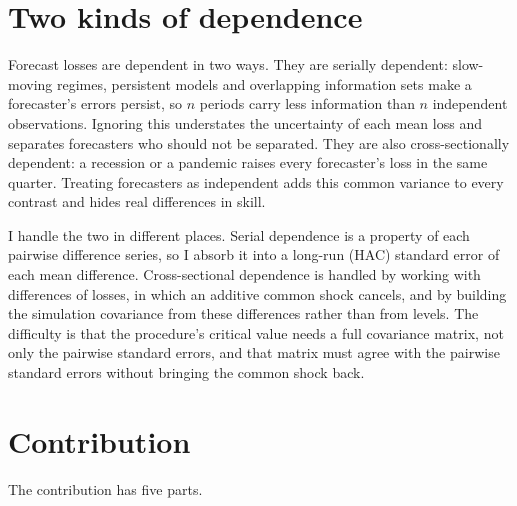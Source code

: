 \section{Two kinds of dependence}
\label{sec:intro-dependence}

Forecast losses are dependent in two ways. They are serially dependent: slow-moving
regimes, persistent models and overlapping information sets make a forecaster's errors
persist, so $n$ periods carry less information than $n$ independent observations.
Ignoring this understates the uncertainty of each mean loss and separates forecasters
who should not be separated. They are also cross-sectionally dependent: a recession or a
pandemic raises every forecaster's loss in the same quarter. Treating forecasters as
independent adds this common variance to every contrast and hides real differences in
skill.

I handle the two in different places. Serial dependence is a property of each pairwise
difference series, so I absorb it into a long-run (HAC) standard error of each mean
difference. Cross-sectional dependence is handled by working with differences of losses,
in which an additive common shock cancels, and by building the simulation covariance from
these differences rather than from levels. The difficulty is that the procedure's
critical value needs a full covariance matrix, not only the pairwise standard errors,
and that matrix must agree with the pairwise standard errors without bringing the
common shock back.

\section{Contribution}
\label{sec:intro-contribution}

The contribution has five parts.

